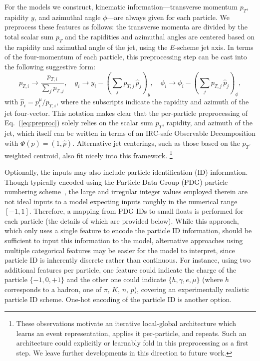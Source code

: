 \documentclass[letterpaper,11pt]{article}
\DeclareRobustCommand{\Eq}[1]{Eq.~(\ref{#1})}
\begin{document}
For the models we construct, kinematic information---transverse momentum $p_T$, rapidity $y$, and azimuthal angle $\phi$---are always given for each particle.
%
We preprocess these features as follows:  the transverse momenta are divided by the total scalar sum $p_T$ and the rapidities and azimuthal angles are centered based on the rapidity and azimuthal angle of the jet, using the $E$-scheme jet axis.
%
In terms of the four-momentum of each particle, this preprocessing step can be cast into the following suggestive form:
%
\begin{equation}\label{eq:preproc}
p_{T,i} \to \frac{p_{T,i}}{\sum_j p_{T,j}},\quad y_i \to y_i -\left( \sum_j p_{T,j}\, \hat p_j\right)_y, \quad\phi_i\to\phi_i-\left( \sum_j p_{T,j}\, \hat p_j\right)_\phi,
\end{equation}
with $\hat p_i = p^\mu_i/p_{T,i}$, where the subscripts indicate the rapidity and azimuth of the jet four-vector.
%
This notation makes clear that the per-particle preprocessing of \Eq{eq:preproc} solely relies on the scalar sum $p_T$, rapidity, and azimuth of the jet, which itself can be written in terms of an IRC-safe Observable Decomposition with $\Phi(\hat p) = (1, \hat p)$.
%
Alternative jet centerings, such as those based on the $p_T$-weighted centroid, also fit nicely into this framework.%
%
\footnote{These observations motivate an iterative local-global architecture which learns an event representation, applies it per-particle, and repeats.
%
Such an architecture could explicitly or learnably fold in this preprocessing as a first step.
%
We leave further developments in this direction to future work.}


Optionally, the inputs may also include particle identification (ID) information.
%
Though typically encoded using the Particle Data Group (PDG) particle numbering scheme~\cite{Tanabashi:2018oca}, the large and irregular integer values employed therein are not ideal inputs to a model expecting inputs roughly in the numerical range $[-1,1]$.
%
Therefore, a mapping from PDG IDs to small floats is performed for each particle (the details of which are provided below).
%
While this approach, which only uses a single feature to encode the particle ID information, should be sufficient to input this information to the model, alternative approaches using multiple categorical features may be easier for the model to interpret, since particle ID is inherently discrete rather than continuous.
%
For instance, using two additional features per particle, one feature could indicate the charge of the particle $\{-1,0,+1\}$ and the other one could indicate $\{h,\gamma,e,\mu\}$ (where $h$ corresponds to a hadron, one of $\pi,\,K,\,n,\,p$), covering an experimentally realistic particle ID scheme.
%
One-hot encoding of the particle ID is another option.
\end{document}
